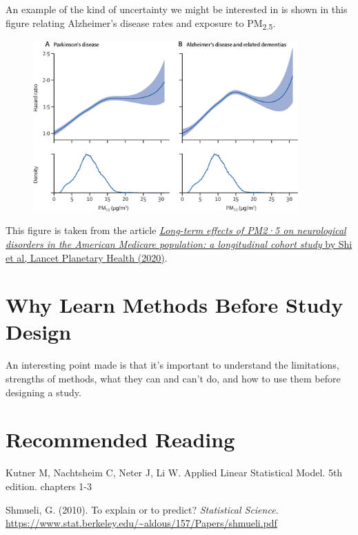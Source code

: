 \documentclass[
  letterpaper,
  DIV=11,
  numbers=noendperiod]{scrreport}
\begin{document}
An example of the kind of uncertainty we might be interested in is shown
in this figure relating Alzheimer's disease rates and exposure to
PM\textsubscript{2.5}.

\begin{figure}

{\centering \includegraphics[width=4in,height=\textheight]{week1/standalone_figures/pm2.5/pm25.jpg}

}

\end{figure}

This figure is taken from the article
\href{https://www.thelancet.com/journals/lanplh/article/PIIS2542-5196(20)30227-8/fulltext}{\emph{Long-term
effects of PM2·5 on neurological disorders in the American Medicare
population: a longitudinal cohort study} by Shi et al, Lancet Planetary
Health (2020)}.

\hypertarget{why-learn-methods-before-study-design}{%
\section{Why Learn Methods Before Study
Design}\label{why-learn-methods-before-study-design}}

An interesting point made is that it's important to understand the
limitations, strengths of methods, what they can and can't do, and how
to use them before designing a study.

\hypertarget{recommended-reading}{%
\section{Recommended Reading}\label{recommended-reading}}

Kutner M, Nachtsheim C, Neter J, Li W. Applied Linear Statistical Model.
5th edition. chapters 1-3

Shmueli, G. (2010). To explain or to predict? \emph{Statistical
Science.}
\url{https://www.stat.berkeley.edu/~aldous/157/Papers/shmueli.pdf}
\end{document}

